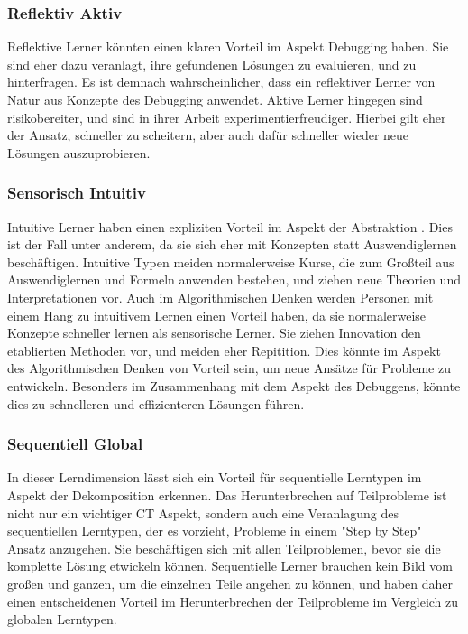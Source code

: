 \subsubsection{Reflektiv Aktiv}
Reflektive Lerner könnten einen klaren Vorteil im Aspekt Debugging haben. Sie sind eher dazu veranlagt, ihre gefundenen Lösungen zu evaluieren, und zu hinterfragen. Es ist demnach wahrscheinlicher, dass ein reflektiver Lerner von Natur aus Konzepte des Debugging anwendet. Aktive Lerner hingegen sind risikobereiter, und sind in ihrer Arbeit experimentierfreudiger. Hierbei gilt eher der Ansatz, schneller zu scheitern, aber auch dafür schneller wieder neue Lösungen auszuprobieren.

\subsubsection{Sensorisch Intuitiv}
Intuitive Lerner haben einen expliziten Vorteil im Aspekt der Abstraktion \cite{felderhandout}. Dies ist der Fall unter anderem, da sie sich eher mit Konzepten statt Auswendiglernen beschäftigen. Intuitive Typen meiden normalerweise Kurse, die zum Großteil aus Auswendiglernen und Formeln anwenden bestehen, und ziehen neue Theorien und Interpretationen vor. %
Auch im Algorithmischen Denken werden Personen mit einem Hang zu intuitivem Lernen einen Vorteil haben, da sie normalerweise Konzepte schneller lernen als sensorische Lerner. Sie ziehen Innovation den etablierten Methoden vor, und meiden eher Repitition. Dies könnte im Aspekt des Algorithmischen Denken von Vorteil sein, um neue Ansätze für Probleme zu entwickeln. Besonders im Zusammenhang mit dem Aspekt des Debuggens, könnte dies zu schnelleren und effizienteren Lösungen führen.

\subsubsection{Sequentiell Global}
In dieser Lerndimension lässt sich ein Vorteil für sequentielle Lerntypen im Aspekt der Dekomposition erkennen. Das Herunterbrechen auf Teilprobleme ist nicht nur ein wichtiger CT Aspekt, sondern auch eine Veranlagung des sequentiellen Lerntypen, der es vorzieht, Probleme in einem "Step by Step" Ansatz anzugehen. Sie beschäftigen sich mit allen Teilproblemen, bevor sie die komplette Lösung etwickeln können. Sequentielle Lerner brauchen kein Bild vom großen und ganzen, um die einzelnen Teile angehen zu können, und haben daher einen entscheidenen Vorteil im Herunterbrechen der Teilprobleme im Vergleich zu globalen Lerntypen.

